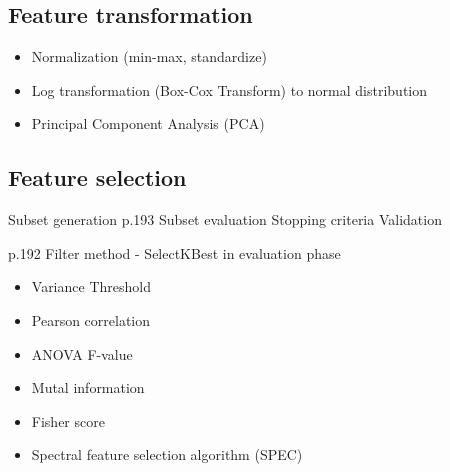 \subsection{Feature transformation}
\cite{zheng_feature_2018}
\begin{itemize}
\item Normalization (min-max, standardize)
\item Log transformation (Box-Cox Transform) to normal distribution
\item Principal Component Analysis (PCA)
\end{itemize}

\subsection{Feature selection}
Subset generation p.193
Subset evaluation
Stopping criteria
Validation

\cite{nandi_condition_2019} p.192
Filter method - SelectKBest  in evaluation phase
\begin{itemize}
\item Variance Threshold
\item Pearson correlation
\item ANOVA F-value
\item Mutal information
\item Fisher score
\item Spectral feature selection algorithm (SPEC)
\end{itemize}

